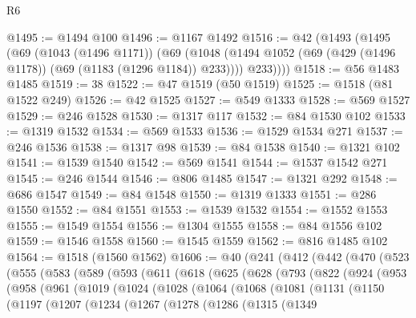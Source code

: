 \begin{lexlean}{R6}
\begin{coremodule}
@1495 := @1494 @100
@1496 := @1167 @1492
@1516 := @42
    (@1493
      (@1495
        (@69
          (@1043 (@1496 @1171))
          (@69
            (@1048 (@1494 @1052 (@69 (@429 (@1496 @1178)) (@69 (@1183 (@1296 @1184)) @233))))
            @233))))
@1518 := @56 @1483 @1485
@1519 := 38
@1522 := @47 @1519 (@50 @1519)
@1525 := @1518 (@81 @1522 @249)
@1526 := @42 @1525
@1527 := @549 @1333
@1528 := @569 @1527
@1529 := @246 @1528
@1530 := @1317 @117
@1532 := @84 @1530 @102
@1533 := @1319 @1532
@1534 := @569 @1533
@1536 := @1529 @1534 @271
@1537 := @246 @1536
@1538 := @1317 @98
@1539 := @84 @1538
@1540 := @1321 @102
@1541 := @1539 @1540
@1542 := @569 @1541
@1544 := @1537 @1542 @271
@1545 := @246 @1544
@1546 := @806 @1485
@1547 := @1321 @292
@1548 := @686 @1547
@1549 := @84 @1548
@1550 := @1319 @1333
@1551 := @286 @1550
@1552 := @84 @1551
@1553 := @1539 @1532
@1554 := @1552 @1553
@1555 := @1549 @1554
@1556 := @1304 @1555
@1558 := @84 @1556 @102
@1559 := @1546 @1558
@1560 := @1545 @1559
@1562 := @816 @1485 @102
@1564 := @1518 (@1560 @1562)
@1606 := @40
    (@241
      (@412
        (@442
          (@470
            (@523
              (@555
                (@583
                  (@589
                    (@593
                      (@611
                        (@618
                          (@625
                            (@628
                              (@793
                                (@822
                                  (@924
                                    (@953
                                      (@958
                                        (@961
                                          (@1019
                                            (@1024
                                              (@1028
                                                (@1064
                                                  (@1068
                                                    (@1081
                                                      (@1131
                                                        (@1150
                                                          (@1197
                                                            (@1207
                                                              (@1234
                                                                (@1267
                                                                  (@1278
                                                                    (@1286
                                                                      (@1315
                                                                        (@1349

\end{coremodule}
\end{lexlean}
